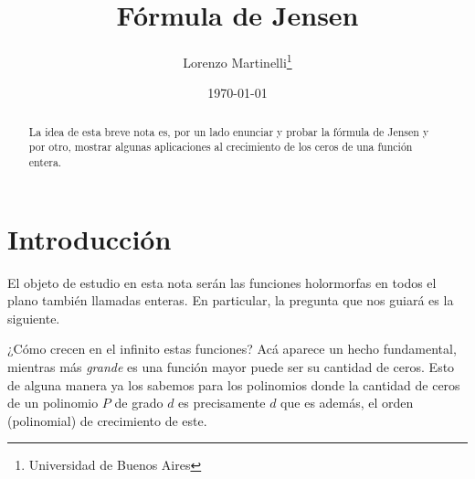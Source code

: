 \documentclass[
]{kaohandt}
\begin{document}
	
	
	\title[]{Fórmula de Jensen}
	
	\author[LM]{Lorenzo Martinelli\thanks{Universidad de Buenos Aires} }
	
	\date{\today}
	
	
	\maketitle
	
	\margintoc
	
	\begin{abstract}
		\noindent
		La idea de esta breve nota es, por un lado enunciar y probar la fórmula de Jensen y por otro, mostrar algunas aplicaciones al crecimiento de los ceros de una función entera.
	\end{abstract}
	
	
	\medskip
	
	
	\section{Introducción}
	
	El objeto de estudio en esta nota serán las funciones holormorfas en todos el plano también llamadas enteras. En particular, la pregunta que nos guiará es la siguiente.
	
	¿Cómo crecen en el infinito estas funciones? Acá aparece un hecho fundamental, mientras más \emph{grande} es una función mayor puede ser su cantidad de ceros. Esto de alguna manera ya los sabemos para los polinomios donde la cantidad de ceros de un polinomio $P$ de grado $d$ es precisamente $d$ que es además, el orden (polinomial) de crecimiento de este.
\end{document}
